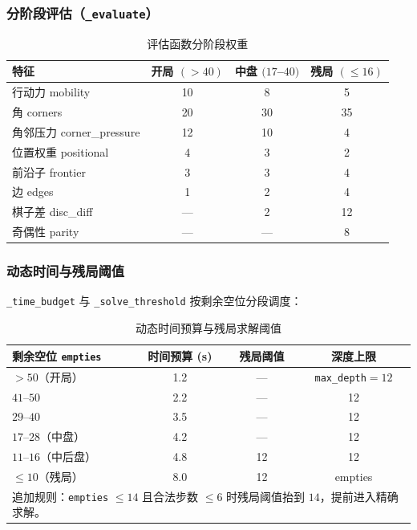 \documentclass[UTF8,a4paper,11pt]{ctexart}
\begin{document}
\subsubsection*{分阶段评估（\texttt{\_evaluate}）}

\begin{table}[H]
\centering
\caption{评估函数分阶段权重}
\begin{tabular}{lccc}
\toprule
特征 & 开局 $(>40)$ & 中盘 $(17$--$40)$ & 残局 $(\le 16)$ \\
\midrule
行动力 mobility          & 10 &  8 &  5 \\
角 corners               & 20 & 30 & 35 \\
角邻压力 corner\_pressure& 12 & 10 &  4 \\
位置权重 positional      &  4 &  3 &  2 \\
前沿子 frontier          &  3 &  3 &  4 \\
边 edges                 &  1 &  2 &  4 \\
棋子差 disc\_diff        &  — &  2 & 12 \\
奇偶性 parity            &  — &  — &  8 \\
\bottomrule
\end{tabular}
\end{table}

\subsubsection*{动态时间与残局阈值}

\texttt{\_time\_budget} 与 \texttt{\_solve\_threshold} 按剩余空位分段调度：

\begin{table}[H]
\centering
\caption{动态时间预算与残局求解阈值}
\begin{tabular}{lccc}
\toprule
剩余空位 \texttt{empties} & 时间预算 (s) & 残局阈值 & 深度上限 \\
\midrule
$>50$（开局）         & 1.2 & — & \texttt{max\_depth}$=12$ \\
$41$--$50$            & 2.2 & — & 12 \\
$29$--$40$            & 3.5 & — & 12 \\
$17$--$28$（中盘）    & 4.2 & — & 12 \\
$11$--$16$（中后盘）  & 4.8 & 12 & 12 \\
$\le 10$（残局）      & 8.0 & 12 & empties \\
\midrule
\multicolumn{4}{l}{\footnotesize 追加规则：\texttt{empties} $\le 14$ 且合法步数 $\le 6$ 时残局阈值抬到 $14$，提前进入精确求解。} \\
\bottomrule
\end{tabular}
\end{table}
\end{document}
